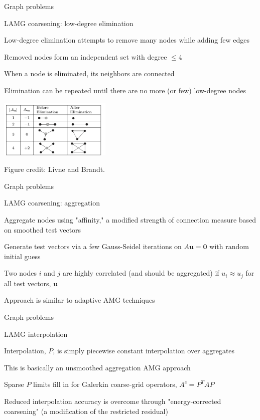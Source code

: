 \documentclass[18pt,xcolor=table]{beamer}
\begin{document}
\begin{frame}{Graph problems}
\begin{block}{LAMG coarsening: low-degree elimination}
\bit
\item Low-degree elimination attempts to remove many nodes while adding few edges
\item Removed nodes form an independent set with degree $\leq 4$
\item When a node is eliminated, its neighbors are connected
\item Elimination can be repeated until there are no more (or few) low-degree nodes
\eit
\end{block}
\begin{center}
\includegraphics[width=0.4\textwidth]{../figures/lowDegreeElim}
\end{center}
\tiny{Figure credit: Livne and Brandt.}
\end{frame}

\begin{frame}{Graph problems}
\begin{block}{LAMG coarsening: aggregation}
\bit
\item Aggregate nodes using "affinity," a modified strength of connection measure based on smoothed test vectors
\item Generate test vectors via a few Gauss-Seidel iterations on $A\mathbf{u} = \mathbf{0}$ with random initial guess
\item Two nodes $i$ and $j$ are highly correlated (and should be aggregated) if $u_i\approx u_j$ for all test vectors, $\mathbf{u}$
\item Approach is similar to adaptive AMG techniques
\eit
\end{block}
\end{frame}

\begin{frame}{Graph problems}
\begin{block}{LAMG interpolation}
\bit
\item Interpolation, $P$, is simply piecewise constant interpolation over aggregates
\item This is basically an unsmoothed aggregation AMG approach
\item Sparse $P$ limits fill in for Galerkin coarse-grid operators, $A^c = P^TAP$
\item Reduced interpolation accuracy is overcome through "energy-corrected coarsening" (a modification of the restricted residual)
\eit
\end{block}
\end{frame}
\end{document}
